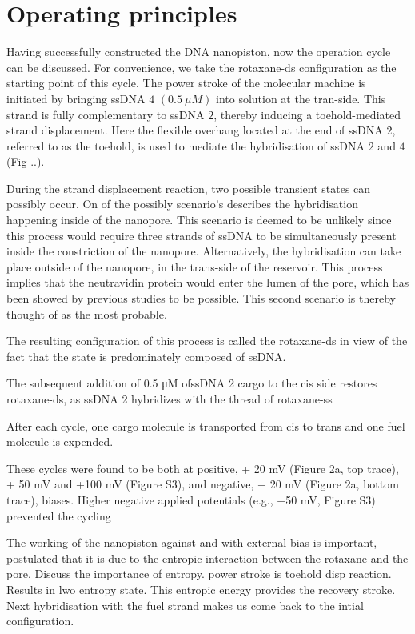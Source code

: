 \section{Operating principles}

Having successfully constructed the DNA nanopiston, now the operation cycle can be
discussed. For convenience, we take the rotaxane-ds configuration as the starting point
of this cycle. The power stroke of the molecular machine is initiated by bringing ssDNA
$4$ $(0.5\ \mu M)$ into solution at the tran-side. This strand is fully complementary to
ssDNA $2$, thereby inducing a toehold-mediated strand displacement. Here the
flexible overhang located at the end of ssDNA $2$, referred to as the toehold, is used to
mediate the hybridisation of ssDNA $2$ and $4$ (Fig ..).

During the strand displacement reaction, two possible transient states can possibly
occur. On of the possibly scenario's describes the hybridisation happening inside of the
nanopore. This scenario is deemed to be unlikely since this process would require three
strands of ssDNA to be simultaneously present inside the constriction of the nanopore.
Alternatively, the hybridisation can take place outside of the nanopore, in the
trans-side of the reservoir. This process implies that the neutravidin protein would
enter the lumen of the pore, which has been showed by previous studies to be possible.
This second scenario is thereby thought of as the most probable.

The resulting configuration of this process is called the rotaxane-ds in view of the fact
that the state is predominately composed of ssDNA.


The subsequent addition of 0.5 μM ofssDNA 2 cargo to the cis side restores rotaxane-ds,
as ssDNA 2 hybridizes with the thread of rotaxane-ss

After each cycle, one cargo molecule is transported from cis to trans and one fuel
molecule is expended.

These cycles were found to be both at positive, + 20 mV (Figure 2a, top trace), + 50 mV
and +100 mV (Figure S3), and negative, − 20 mV (Figure 2a,
bottom trace), biases. Higher negative applied potentials (e.g., −50 mV, Figure S3)
prevented the cycling

The working of the nanopiston against and with external bias is important, postulated
that it is due to the entropic interaction between the rotaxane and the pore.
Discuss the importance of entropy. power stroke is toehold disp reaction. Results in lwo
entropy state. This entropic energy provides the recovery stroke. Next hybridisation with
the fuel strand makes us come back to the intial configuration.

